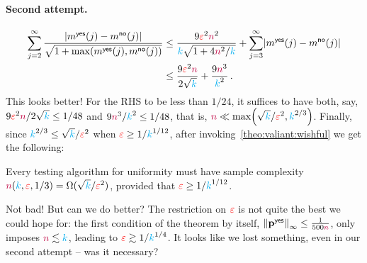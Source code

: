 \paragraph{Second attempt.} 
\begin{align*}
\sum_{j=2}^\infty \frac{\abs{m^{\yes}(j)-m^{\no}(j)}}{\sqrt{1+\max(m^{\yes}(j),m^{\no}(j))}}
&\leq
\frac{9\dst^2\ns^2}{\ab\sqrt{1+4\ns^2/\ab}}+\sum_{j=3}^\infty \abs{m^{\yes}(j)-m^{\no}(j)} \\
&\leq \frac{9\dst^2\ns}{2\sqrt{\ab}} + \frac{9\ns^3}{\ab^2}\,.
\end{align*}
This looks better! For the RHS to be less than $1/24$, it suffices to have both, say, ${9\textcolor{red}{\varepsilon}^2{\textcolor{purple}{n}}}/{2\sqrt{{\textcolor{cyan}{k}}}} \leq 1/48$ and ${9{\textcolor{purple}{n}}^3}/{{\textcolor{cyan}{k}}^2} \leq 1/48$, that is, $\ns \ll \max\Paren{\sqrt{\ab}/\dst^2, \ab^{2/3}}$. Finally, since ${\textcolor{cyan}{k}}^{2/3} \leq \sqrt{{\textcolor{cyan}{k}}}/\textcolor{red}{\varepsilon}^2$ when $\textcolor{red}{\varepsilon} \geq 1/{\textcolor{cyan}{k}}^{1/12}$, after invoking~\cref{theo:valiant:wishful} we get the following:
\begin{proposition}
  \label{prop:uniformity:lb:valiant}
Every testing algorithm for uniformity must have sample complexity ${\textcolor{purple}{n}}({\textcolor{cyan}{k}},\textcolor{red}{\varepsilon},1/3) = \Omega(\sqrt{{\textcolor{cyan}{k}}}/\textcolor{red}{\varepsilon}^2)$, provided that $\textcolor{red}{\varepsilon} \geq 1/{\textcolor{cyan}{k}}^{1/12}$.
\end{proposition}
Not bad! But can we do better? The restriction on $\textcolor{red}{\varepsilon}$ is not quite the best we could hope for: the first condition of the theorem by itself, $\norminf{\p^\yes} \leq \frac{1}{500\ns}$, only imposes ${\textcolor{purple}{n}} \lesssim {\textcolor{cyan}{k}}$, leading to $\textcolor{red}{\varepsilon}\gtrsim 1/{\textcolor{cyan}{k}}^{1/4}$. It looks like we lost something, even in our second attempt -- was it necessary?

